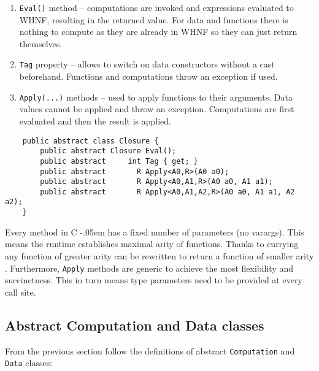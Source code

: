 \documentclass[en]{pracamgr}
\newcommand{\shrp}{%
  {\settoheight{\dimen0}{C}\kern-.05em \resizebox{!}{\dimen0}{\raisebox{\depth}{\textbf{\#}}}\hspace{1ex}}}
\begin{document}
\begin{enumerate}
    \item \texttt{Eval()} method -- computations are
    invoked and expressions evaluated to WHNF, resulting in
    the returned value. For data and functions there is
    nothing to compute as they are already in WHNF so they
    can just return themselves.
    \item \texttt{Tag} property -- allows to switch on data
    constructors without a cast beforehand. Functions and
    computations throw an exception if used.
    \item \texttt{Apply(...)} methods -- used to apply
    functions to their arguments. Data values cannot be
    applied and throw an exception. Computations are first
    evaluated and then the result is applied.
\end{enumerate}

\begin{verbatim}
    public abstract class Closure {
        public abstract Closure Eval();
        public abstract     int Tag { get; }
        public abstract       R Apply<A0,R>(A0 a0);
        public abstract       R Apply<A0,A1,R>(A0 a0, A1 a1);
        public abstract       R Apply<A0,A1,A2,R>(A0 a0, A1 a1, A2 a2);
    }
\end{verbatim}

Every method in C\shrp has a fixed number of parameters (no varargs).
This means the runtime establishes maximal arity of functions.
Thanks to currying any function of greater arity can be
rewritten to return a function of smaller arity \cite{Curry}.
Furthermore, \texttt{Apply} methods are generic to achieve
the most flexibility and succinctness.
This in turn means type parameters need to be provided at every call site.

\newpage
\subsection{Abstract Computation and Data classes}

From the previous section follow the definitions of  abstract \texttt{Computation} and \texttt{Data} classes:
\end{document}
